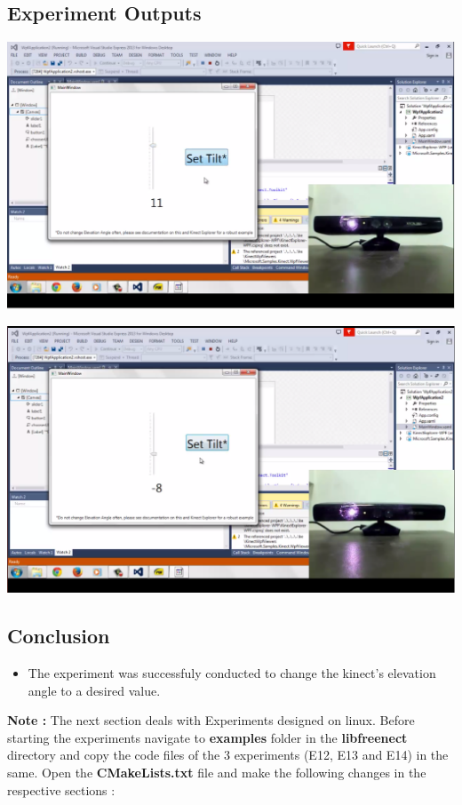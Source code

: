 \begin{flushleft}
\subsection{\textbf{ Experiment Outputs}}

\includegraphics[scale = 0.5]{e111}

\medskip
\includegraphics[scale = 0.5]{e112}

\medskip
\subsection{\textbf{ Conclusion}}
\begin{itemize}
\item The experiment was successfuly conducted to change the kinect's elevation angle to a desired value.
\end{itemize}
\medskip

\medskip
\newpage
\textbf{Note : }
The next section deals with Experiments designed on linux.
Before starting the experiments navigate to \textbf{examples} folder in the \textbf{libfreenect} directory and copy the code files of the 3 experiments (E12, E13 and E14) in the same. Open the \textbf{CMakeLists.txt} file and make the following changes in the respective sections :


\end{flushleft}
